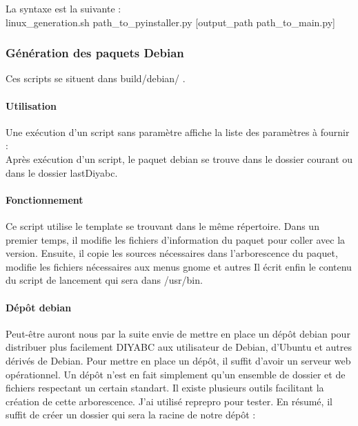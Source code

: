 \documentclass[12pt,a4paper]{article}
\begin{document}
        La syntaxe est la suivante :\\ 
        linux\_generation.sh  path\_to\_pyinstaller.py  [output\_path
        path\_to\_main.py]

        \subsubsection{Génération des paquets Debian}

        Ces scripts se situent dans build/debian/ .
        \paragraph{Utilisation}

        Une exécution d'un script sans paramètre affiche la liste des paramètres à fournir :\\

        Après exécution d'un script, le paquet debian se trouve dans le dossier
        courant ou dans le dossier lastDiyabc.

        \paragraph{Fonctionnement}
        Ce script utilise le template se trouvant dans le même répertoire. Dans
        un premier temps, il modifie les fichiers d'information du paquet pour
        coller avec la version. Ensuite, il copie les sources nécessaires dans
        l'arborescence du paquet, modifie les fichiers nécessaires aux menus
        gnome et autres Il écrit enfin le contenu du script de lancement qui
        sera dans /usr/bin.

        \paragraph{Dépôt debian}
        Peut-être auront nous par la suite envie de mettre en place un dépôt
        debian pour distribuer plus facilement DIYABC aux utilisateur de Debian,
        d'Ubuntu et autres dérivés de Debian. Pour mettre en place un dépôt, il
        suffit d'avoir un serveur web opérationnel. Un dépôt n'est en fait
        simplement qu'un ensemble de dossier et de fichiers respectant un
        certain standart. Il existe plusieurs outils facilitant la création de
        cette arborescence. J'ai utilisé reprepro pour tester. En résumé, il
        suffit de créer un dossier qui sera la racine de notre dépôt :\\
\end{document}
